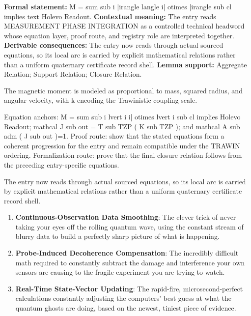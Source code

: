 \begingroup\footnotesize\setlength{\emergencystretch}{3em}\sloppy
\textbf{Formal statement:} M = sum sub i |irangle langle i| otimes |irangle sub cl implies text Holevo Readout. \textbf{Contextual meaning:} The entry reads MEASUREMENT PHASE INTEGRATION as a controlled technical headword whose equation layer, proof route, and registry role are interpreted together. \textbf{Derivable consequences:} The entry now reads through actual sourced equations, so its local arc is carried by explicit mathematical relations rather than a uniform quaternary certificate record shell. \textbf{Lemma support:} Aggregate Relation; Support Relation; Closure Relation.\par
\endgroup

The magnetic moment is modeled as proportional to mass, squared radius, and angular velocity, with k encoding the Trawinistic coupling scale.

Equation anchors: M = sum sub i lvert i i| otimes lvert i sub cl implies Holevo Readout; mathcal J sub out = T sub TZP ( K sub TZP ); and mathcal A sub adm ( J sub out )=1. Proof route: show that the stated equations form a coherent progression for the entry and remain compatible under the TRAWIN ordering. Formalization route: prove that the final closure relation follows from the preceding entry-specific equations.

The entry now reads through actual sourced equations, so its local arc is carried by explicit mathematical relations rather than a uniform quaternary certificate record shell.
\endgroup

\begin{enumerate}[leftmargin=1.6em,itemsep=6pt,topsep=4pt]
\item \textbf{Continuous-Observation Data Smoothing}: The clever trick of never taking your eyes off the rolling quantum wave, using the constant stream of blurry data to build a perfectly sharp picture of what is happening.
\item \textbf{Probe-Induced Decoherence Compensation}: The incredibly difficult math required to constantly subtract the damage and interference your own sensors are causing to the fragile experiment you are trying to watch.
\item \textbf{Real-Time State-Vector Updating}: The rapid-fire, microsecond-perfect calculations constantly adjusting the computers' best guess at what the quantum ghosts are doing, based on the newest, tiniest piece of evidence.
\end{enumerate}

